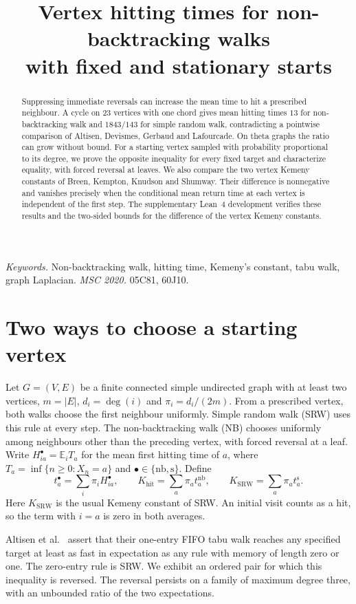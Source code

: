 \documentclass[11pt]{article}
\title{Vertex hitting times for non-backtracking walks\\
       with fixed and stationary starts}
\author{}
\date{}
\makeatletter
\newcommand{\nb}{\mathrm{nb}}
\newcommand{\sr}{\mathrm{s}}
\newcommand{\kh}{K_{\mathrm{hit}}}
\newcommand{\ks}{K_{\mathrm{SRW}}}
\newcommand{\E}{\mathbb E}
\renewcommand{\maketitle}{%
  \begin{center}
    {\LARGE\@title\par}
    \ifx\@author\@empty\else
      \vspace{0.6em}{\large\begin{tabular}[t]{c}\@author\end{tabular}\par}
    \fi
  \end{center}\vspace{0.4em}}
\makeatother
\begin{document}
\maketitle
\begin{abstract}
Suppressing immediate reversals can increase the mean time to hit a prescribed
neighbour. A cycle on 23 vertices with one chord gives mean hitting times
$13$ for non-backtracking walk and $1843/143$ for simple random walk,
contradicting a pointwise comparison of Altisen, Devismes, Gerbaud and
Lafourcade. On theta graphs the ratio can grow without bound. For a starting
vertex sampled with probability proportional to its degree, we prove the opposite inequality for
every fixed target and characterize equality, with forced reversal at leaves.
We also compare the two vertex Kemeny constants of Breen, Kempton, Knudson
and Shumway. Their difference is nonnegative and vanishes precisely when
the conditional mean return time at each vertex is independent of the first
step. The supplementary Lean~4 development verifies these results and the
two-sided bounds for the difference of the vertex Kemeny constants.
\end{abstract}
\noindent\textit{Keywords.} Non-backtracking walk, hitting time, Kemeny's constant,
tabu walk, graph Laplacian. \quad \textit{MSC 2020.} 05C81, 60J10.

\section{Two ways to choose a starting vertex}
Let $G=(V,E)$ be a finite connected simple undirected graph with at least two
vertices, $m=|E|$, $d_i=\deg(i)$ and $\pi_i=d_i/(2m)$. From a prescribed
vertex, both walks choose the first neighbour uniformly. Simple random walk
(SRW) uses this rule at every step. The non-backtracking walk (NB) chooses
uniformly among neighbours other than the preceding vertex, with forced
reversal at a leaf. Write $H^\bullet_{ia}=\E_i T_a$ for the mean first
hitting time of $a$, where $T_a=\inf\{n\ge0:X_n=a\}$ and
$\bullet\in\{\nb,\sr\}$. Define
\[
 t^\bullet_a=\sum_i\pi_i H^\bullet_{ia},\qquad
 \kh=\sum_a\pi_a t^\nb_a,\qquad \ks=\sum_a\pi_a t^\sr_a .
\]
Here $\ks$ is the usual Kemeny constant of SRW. An initial visit counts as
a hit, so the term with $i=a$ is zero in both averages.

Altisen et al.~\cite[Cor.~5, author version]{ADGL} assert that their
one-entry FIFO tabu walk reaches any specified target at least as fast in
expectation as any rule with memory of length zero or one. The zero-entry
rule is SRW. We exhibit an ordered pair for which this inequality is reversed.
The reversal persists on a family of maximum degree three, with an
unbounded ratio of the two expectations.
\end{document}
